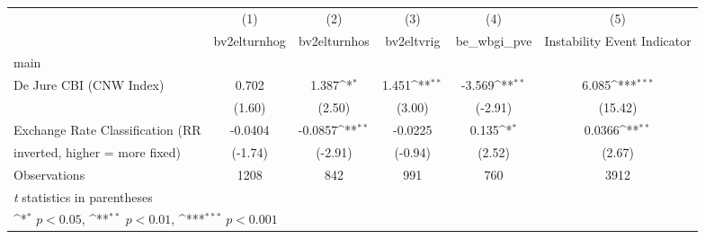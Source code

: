 {
\def\sym#1{\ifmmode^{#1}\else\(^{#1}\)\fi}
\begin{tabular}{l*{5}{c}}
\toprule
                                        &\multicolumn{1}{c}{(1)}&\multicolumn{1}{c}{(2)}&\multicolumn{1}{c}{(3)}&\multicolumn{1}{c}{(4)}&\multicolumn{1}{c}{(5)}\\
                                        &\multicolumn{1}{c}{bv2elturnhog}&\multicolumn{1}{c}{bv2elturnhos}&\multicolumn{1}{c}{bv2eltvrig}&\multicolumn{1}{c}{be\_wbgi\_pve}&\multicolumn{1}{c}{Instability Event Indicator}\\
\midrule
main                                    &                   &                   &                   &                   &                   \\
De Jure CBI (CNW Index)                 &     0.702         &     1.387\sym{*}  &     1.451\sym{**} &    -3.569\sym{**} &     6.085\sym{***}\\
                                        &    (1.60)         &    (2.50)         &    (3.00)         &   (-2.91)         &   (15.42)         \\
\addlinespace
Exchange Rate Classification (RR        &   -0.0404         &   -0.0857\sym{**} &   -0.0225         &     0.135\sym{*}  &    0.0366\sym{**} \\
inverted, higher = more fixed)          &   (-1.74)         &   (-2.91)         &   (-0.94)         &    (2.52)         &    (2.67)         \\
\midrule
Observations                            &      1208         &       842         &       991         &       760         &      3912         \\
\bottomrule
\multicolumn{6}{l}{\footnotesize \textit{t} statistics in parentheses}\\
\multicolumn{6}{l}{\footnotesize \sym{*} \(p<0.05\), \sym{**} \(p<0.01\), \sym{***} \(p<0.001\)}\\
\end{tabular}
}
